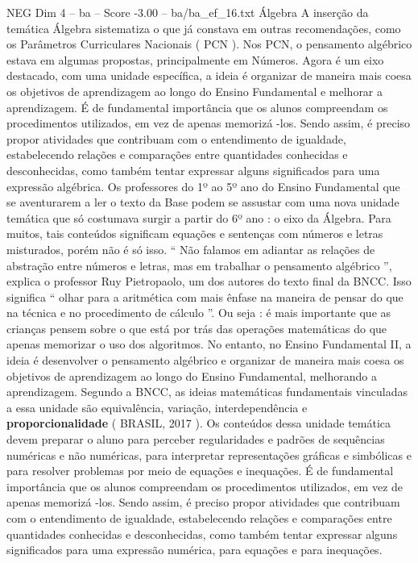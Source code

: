 \begin{textsample}{NEG Dim 4 – ba – Score -3.00 – ba/ba\_ef\_16.txt}
Álgebra A inserção da temática Álgebra sistematiza o que já constava em outras recomendações, como os Parâmetros Curriculares Nacionais ( PCN ).
Nos PCN, o pensamento algébrico estava em algumas propostas, principalmente em Números.
Agora é um eixo destacado, com uma unidade específica, a ideia é organizar de maneira mais coesa os objetivos de aprendizagem ao longo do Ensino Fundamental e melhorar a aprendizagem.
É de fundamental importância que os alunos compreendam os procedimentos utilizados, em vez de apenas memorizá -los.
Sendo assim, é preciso propor atividades que contribuam com o entendimento de igualdade, estabelecendo relações e comparações entre quantidades conhecidas e desconhecidas, como também tentar expressar alguns significados para uma expressão algébrica.
Os professores do 1º ao 5º ano do Ensino Fundamental que se aventurarem a ler o texto da Base podem se assustar com uma nova unidade temática que só costumava surgir a partir do 6º ano : o eixo da Álgebra.
Para muitos, tais conteúdos significam equações e sentenças com números e letras misturados, porém não é só isso. “ Não falamos em adiantar as relações de abstração entre números e letras, mas em trabalhar o pensamento algébrico ”, explica o professor Ruy Pietropaolo, um dos autores do texto final da BNCC.
Isso significa “ olhar para a aritmética com mais ênfase na maneira de pensar do que na técnica e no procedimento de cálculo ”.
Ou seja : é mais importante que as crianças pensem sobre o que está por trás das operações matemáticas do que apenas memorizar o uso dos algoritmos.
No entanto, no Ensino Fundamental II, a ideia é desenvolver o pensamento algébrico e organizar de maneira mais coesa os objetivos de aprendizagem ao longo do Ensino Fundamental, melhorando a aprendizagem.
Segundo a BNCC, as ideias matemáticas fundamentais vinculadas a essa unidade são equivalência, variação, interdependência e \textbf{proporcionalidade} ( BRASIL, 2017 ).
Os conteúdos dessa unidade temática devem preparar o aluno para perceber regularidades e padrões de sequências numéricas e não numéricas, para interpretar representações gráficas e simbólicas e para resolver problemas por meio de equações e inequações.
É de fundamental importância que os alunos compreendam os procedimentos utilizados, em vez de apenas memorizá -los.
Sendo assim, é preciso propor atividades que contribuam com o entendimento de igualdade, estabelecendo relações e comparações entre quantidades conhecidas e desconhecidas, como também tentar expressar alguns significados para uma expressão numérica, para equações e para inequações.

\end{textsample}
